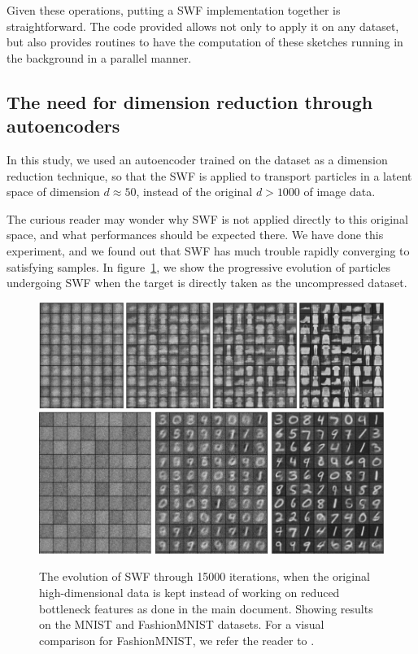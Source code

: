 Given these operations, putting a SWF implementation together is straightforward.
The code provided allows not only to apply it on any dataset, but also provides routines to have the computation of these sketches running in the background in a parallel manner.

\subsection{The need for dimension reduction through autoencoders}

In this study, we used an autoencoder trained on the dataset as a dimension reduction technique, so that the SWF is applied to transport particles in a latent space of dimension $d\approx 50$, instead of the original $d>1000$ of image data.

The curious reader may wonder why SWF is not applied directly to this original space, and what performances should be expected there. We have done this experiment, and we found out that SWF has much trouble rapidly converging to satisfying samples. In figure~\ref{fig:suppnoae}, we show the progressive evolution of particles undergoing SWF when the target is directly taken as the uncompressed dataset.

\begin{figure}
\centering
\includegraphics[width=\columnwidth]{figures/supplementary/fmnist.png}
\includegraphics[width=\columnwidth]{figures/supplementary/mnist.png}
\caption{The evolution of SWF through 15000 iterations, when the original high-dimensional data is kept instead of working on reduced bottleneck features as done in the main document. Showing results on the MNIST and FashionMNIST datasets. For a visual comparison for FashionMNIST, we refer the reader to \cite{samangouei2018defensegan}.}
\label{fig:suppnoae}
\end{figure}

